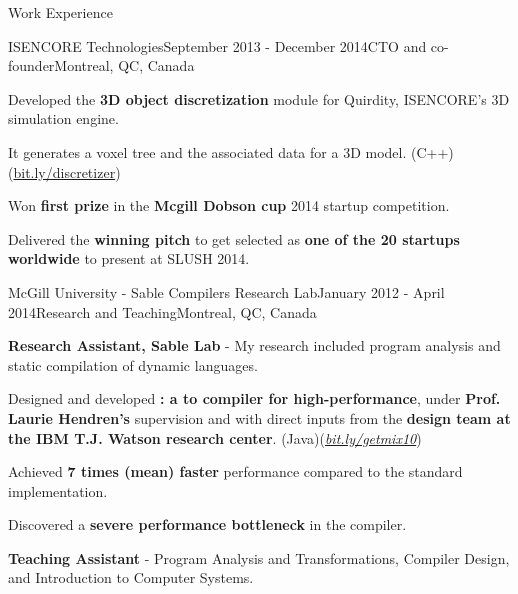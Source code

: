 \documentclass{resume} %
\begin{document}
\begin{rSection}{Work Experience}
\begin{rSubsection}{ISENCORE Technologies}{September 2013 - December 2014}{CTO
        and co-founder}{Montreal, QC, Canada}
\item Developed the \textbf{3D object discretization} module for
        Quirdity, ISENCORE's 3D simulation engine. 
\begin{lsubSubsection}
\item It generates a voxel tree and the associated data for a 3D model.
        (C++)(\href{http://bit.ly/discretizer}{bit.ly/discretizer})
\end{lsubSubsection}
\item Won \textbf{first prize} in the \textbf{Mcgill Dobson cup} 2014 startup
        competition. 
\item Delivered the \textbf{winning pitch} to get selected as \textbf{one of
        the 20 startups worldwide} to present at SLUSH 2014.
\end{rSubsection}

\begin{rSubsection}{McGill University - Sable Compilers Research Lab}{January
        2012 - April 2014}{Research and Teaching}{Montreal, QC, Canada} 
\item \textbf{Research Assistant, Sable Lab} - My research included program
        analysis and static compilation of dynamic languages.

\begin{lsubSubsection}
\item Designed and developed \textbf{\mixtenx: a \matlab to \xten  compiler for
        high-performance}, under \textbf{Prof. Laurie Hendren's} supervision
        and with direct inputs from the \textbf{\xten design team at the IBM
        T.J. Watson research center}.
        (Java)(\href{http://bit.ly/getmix10}{\em{bit.ly/getmix10}})  
 \item Achieved \textbf{7 times (mean) faster} performance compared to the
 standard \matlab implementation.
  \item Discovered a \textbf{severe performance bottleneck}
in the \xten compiler.  
\end{lsubSubsection}
\item \textbf{Teaching Assistant} - Program Analysis and Transformations,
	Compiler Design, and Introduction to Computer Systems.
\end{rSubsection}


\end{rSection}
\end{document}

